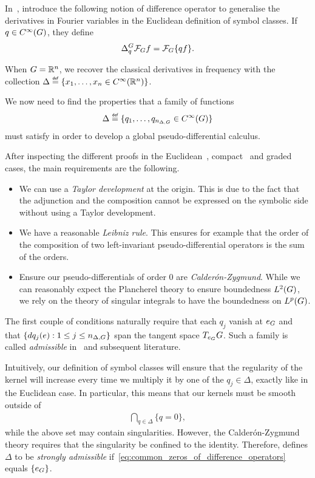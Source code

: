 In~\cite{RuzhanskyTurunen10},
\citeauthor{RuzhanskyTurunen10} introduce the following notion of difference operator
to generalise the derivatives in Fourier variables in the Euclidean definition of symbol classes.
If $q \in \SmoothFunctions \Group$,
they define
\begin{align*}
    \DifferenceOperator [\Group] q \Fourier f = \Fourier \{q f\}.
\end{align*}

When $\Group = \R^n$,
we recover the classical derivatives in frequency with the collection
$\Delta \defeq \{x_1, \dots, x_n \in \SmoothFunctions {\R^n}\}$.

We now need to find the properties that a family of functions
\begin{align*}
    \Delta \defeq \{q_1, \dots, q_{\dimDifferenceOperators} \in \SmoothFunctions \Group\}
\end{align*}
must satisfy in order to develop a global pseudo-differential calculus.

After inspecting the different proofs in the Euclidean~\cite{Stein93},
compact~\cite{RuzhanskyTurunen10,Fischer2015} and graded~\cite{FischerRuzhansky16} cases,
the main requirements are the following.
\begin{itemize}
    \item We can use a \emph{Taylor development} at the origin.
        This is due to the fact that the adjunction and the composition cannot be expressed on the symbolic side without using a Taylor development.
    \item We have a reasonable \emph{Leibniz rule}.
        This ensures for example that the order of the composition of two left-invariant pseudo-differential operators is the sum of the orders.
    \item Ensure our pseudo-differentials of order $0$ are \emph{Calder\'on-Zygmund}.
        While we can reasonably expect the Plancherel theory to ensure boundedness $\Lebesgue 2 \Group$,
        we rely on the theory of singular integrals to have the boundedness on $\Lebesgue p \Group$.
\end{itemize}

The first couple of conditions naturally require that each $q_j$ vanish at $e_\Group$ and that $\{dq_j(e) : 1 \leq j \leq \dimDifferenceOperators\}$ span the tangent space $T_{e_\Group} G$.
Such a family is called \emph{admissible} in~\cite{RuzhanskyTurunenWirth10} and subsequent literature.

Intuitively,
our definition of symbol classes will ensure that the regularity of the kernel will increase every time we multiply it by one of the $q_j \in \Delta$,
exactly like in the Euclidean case.
In particular,
this means that our kernels must be smooth outside of
\begin{align}
    \bigcap_{q \in \Delta} \{q = 0\},
    \label{eq:common_zeros_of_difference_operators}
\end{align}
while the above set may contain singularities.
However,
the Calder\'on-Zygmund theory requires that the singularity be confined to the identity.
Therefore,
\cite{RuzhanskyTurunenWirth10} defines $\Delta$ to be \emph{strongly admissible}
if~\eqref{eq:common_zeros_of_difference_operators} equals $\{e_\Group\}$.

